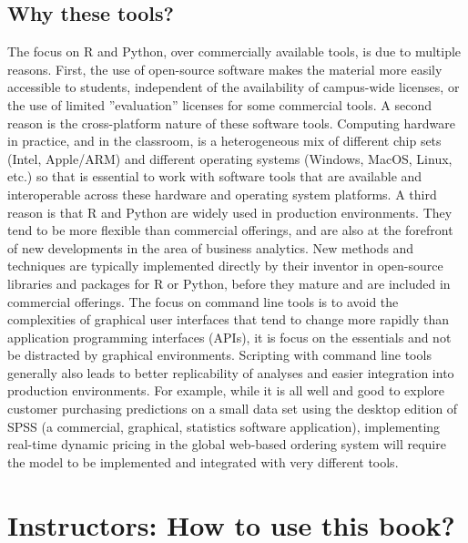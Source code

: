 \begin{withcode}
\section*{Why these tools?}

The focus on R and Python, over commercially available tools, is due to multiple reasons. First, the use of open-source software makes the material more easily accessible to students, independent of the availability of campus-wide licenses, or the use of limited ''evaluation'' licenses for some commercial tools. A second reason is the cross-platform nature of these software tools. Computing hardware in practice, and in the classroom, is a heterogeneous mix of different chip sets (Intel, Apple/ARM) and different operating systems (Windows, MacOS, Linux, etc.) so that is essential to work with software tools that are available and interoperable across these hardware and operating system platforms. A third reason is that R and Python are widely used in production environments. They tend to be more flexible than commercial offerings, and are also at the forefront of new developments in the area of business analytics. New methods and techniques are typically implemented directly by their inventor in open-source libraries and packages for R or Python, before they mature and are included in commercial offerings. The focus on command line tools is to avoid the complexities of graphical user interfaces that tend to change more rapidly than application programming interfaces (APIs), it is focus on the essentials and not be distracted by graphical environments. Scripting with command line tools generally also leads to better replicability of analyses and easier integration into production environments. For example, while it is all well and good to explore customer purchasing predictions on a small data set using the desktop edition of SPSS (a commercial, graphical, statistics software application), implementing real-time dynamic pricing in the global web-based ordering system will require the model to be implemented and integrated with very different tools.
\end{withcode}

\section*{Instructors: How to use this book?}

